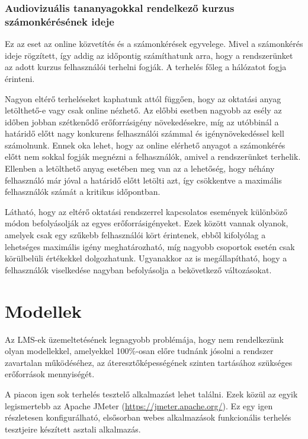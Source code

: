 \subsubsection{Audiovizuális tananyagokkal rendelkező kurzus számonkérésének ideje}

Ez az eset az online közvetítés és a számonkérések egyvelege. Mivel a számonkérés ideje rögzített, így addig az időpontig számíthatunk arra, hogy a rendszerünket az adott kurzus felhasználói terhelni fogják. A terhelés főleg a hálózatot fogja érinteni.

Nagyon eltérő terheléseket kaphatunk attól függően, hogy az oktatási anyag letölthető-e vagy csak online nézhető. Az előbbi esetben nagyobb az esély az időben jobban szétkenődő erőforrásigény növekedésekre, míg az utóbbinál a határidő előtt nagy konkurens felhasználói számmal és igénynövekedéssel kell számolnunk. Ennek oka lehet, hogy az online elérhető anyagot a számonkérés előtt nem sokkal fogják megnézni a felhasználók, amivel a rendszerünket terhelik. Ellenben a letölthető anyag esetében meg van az a lehetőség, hogy néhány felhasználó már jóval a határidő előtt letölti azt, így csökkentve a maximális felhasználók számát a kritikus időpontban.

Látható, hogy az eltérő oktatási rendszerrel kapcsolatos események különböző módon befolyásolják az egyes erőforrásigényeket. Ezek között vannak olyanok, amelyek csak egy szűkebb felhasználói kört érintenek, ebből kifolyólag a lehetséges maximális igény meghatározható, míg nagyobb csoportok esetén csak körülbelüli értékekkel dolgozhatunk. Ugyanakkor az is megállapítható, hogy a felhasználók viselkedése nagyban befolyásolja a bekövetkező változásokat. 

\section{Modellek}\label{sec:modellek}

Az LMS-ek üzemeltetésének legnagyobb problémája, hogy nem rendelkezünk olyan modellekkel, amelyekkel 100\%-osan előre tudnánk jósolni a rendszer zavartalan működéséhez, az áteresztőképességének szinten tartásához szükséges erőforrások mennyiségét.

A piacon igen sok terhelés tesztelő alkalmazást lehet találni. Ezek közül az egyik legismertebb az Apache JMeter (\href{https://jmeter.apache.org/}{https://jmeter.apache.org/}). Ez egy igen részletesen konfigurálható, elsősorban webes alkalmazások funkcionális terhelés tesztjeire készített asztali alkalmazás.

